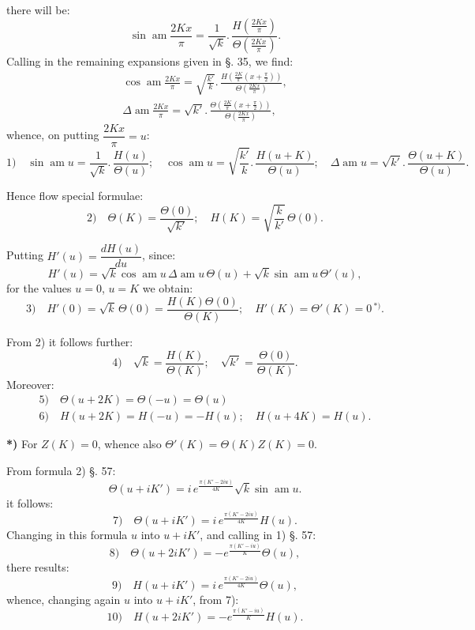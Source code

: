 \documentclass{article}
\begin{document}
there will be:
\[
\sin\operatorname{am}\frac{2Kx}{\pi}=\frac{1}{\sqrt{k}}.\,\frac{H\left(\frac{2Kx}{\pi}\right)}{\Theta\left(\frac{2Kx}{\pi}\right)}.
\]
Calling in the remaining expansions given in §. 35, we find:
\[
\begin{gathered}
\cos\operatorname{am}\frac{2Kx}{\pi}=\sqrt{\frac{k'}{k}}.\,\frac{H\left(\frac{2K}{\pi}\left(x+\frac{\pi}{2}\right)\right)}{\Theta\left(\frac{2Kx}{\pi}\right)},\\[2ex]
\Delta\operatorname{am}\frac{2Kx}{\pi}=\sqrt{k'}.\,\frac{\Theta\left(\frac{2K}{\pi}\left(x+\frac{\pi}{2}\right)\right)}{\Theta\left(\frac{2Kx}{\pi}\right)},
\end{gathered}
\]
whence, on putting $\dfrac{2Kx}{\pi}=u$:
\[
\text{1)}\quad\sin\operatorname{am}u=\frac{1}{\sqrt{k}}.\,\frac{H(u)}{\Theta(u)};\quad\cos\operatorname{am}u=\sqrt{\frac{k'}{k}}.\,\frac{H(u+K)}{\Theta(u)};\quad\Delta\operatorname{am}u=\sqrt{k'}.\,\frac{\Theta(u+K)}{\Theta(u)}.
\]

Hence flow special formulae:
\[
\text{2)}\quad\Theta(K)=\frac{\Theta(0)}{\sqrt{k'}};\quad H(K)=\sqrt{\frac{k}{k'}}\,\Theta(0).
\]

Putting $H'(u)=\dfrac{dH(u)}{du}$, since:
\[
H'(u)=\sqrt{k}\cos\operatorname{am}u\,\Delta\operatorname{am}u\,\Theta(u)+\sqrt{k}\sin\operatorname{am}u\,\Theta'(u),
\]
for the values $u=0$, $u=K$ we obtain:
\[
\text{3)}\quad H'(0)=\sqrt{k}\,\Theta(0)=\frac{H(K)\Theta(0)}{\Theta(K)};\quad H'(K)=\Theta'(K)=0\,{}^{*)}.
\]

From 2) it follows further:
\[
\text{4)}\quad\sqrt{k}=\frac{H(K)}{\Theta(K)};\quad\sqrt{k'}=\frac{\Theta(0)}{\Theta(K)}.
\]
Moreover:
\[
\begin{gathered}
\text{5)}\quad\Theta(u+2K)=\Theta(-u)=\Theta(u)\\[1ex]
\text{6)}\quad H(u+2K)=H(-u)=-H(u);\quad H(u+4K)=H(u).
\end{gathered}
\]

\textbf{*)} For $Z(K)=0$, whence also $\Theta'(K)=\Theta(K)Z(K)=0$.

From formula 2) §. 57:
\[
\Theta(u+iK')=i\,e^{\frac{\pi(K'-2iu)}{4K}}\sqrt{k}\sin\operatorname{am}u.
\]
it follows:
\[
\text{7)}\quad\Theta(u+iK')=i\,e^{\frac{\pi(K'-2iu)}{4K}}H(u).
\]
Changing in this formula $u$ into $u+iK'$, and calling in 1) §. 57:
\[
\text{8)}\quad\Theta(u+2iK')=-e^{\frac{\pi(K'-iu)}{K}}\Theta(u),
\]
there results:
\[
\text{9)}\quad H(u+iK')=i\,e^{\frac{\pi(K'-2iu)}{4K}}\Theta(u),
\]
whence, changing again $u$ into $u+iK'$, from 7):
\[
\text{10)}\quad H(u+2iK')=-e^{\frac{\pi(K'-iu)}{K}}H(u).
\]
\end{document}
